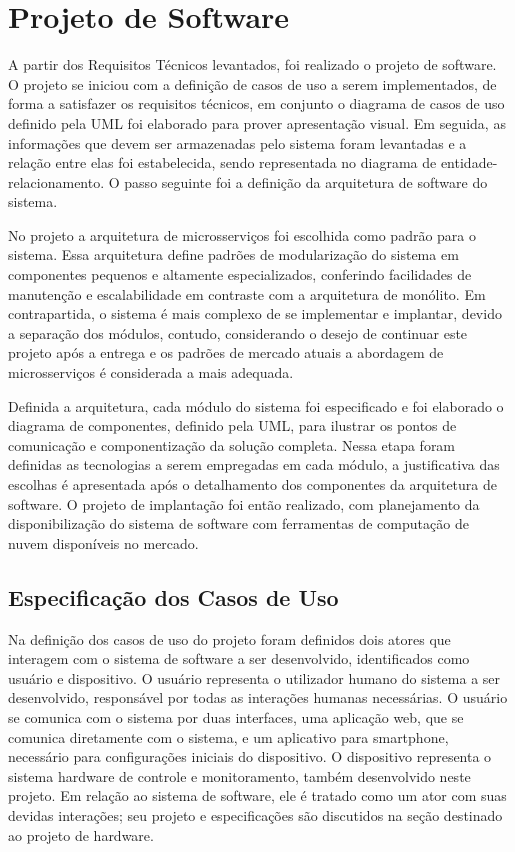\section{Projeto de Software}

A partir dos Requisitos Técnicos levantados, foi realizado o projeto de software. O projeto se iniciou com a definição de casos de uso a serem implementados, de forma a satisfazer os requisitos técnicos, em conjunto o diagrama de casos de uso definido pela UML foi elaborado para prover apresentação visual. Em seguida, as informações que devem ser armazenadas pelo sistema foram levantadas e a relação entre elas foi estabelecida, sendo representada no diagrama de entidade-relacionamento. O passo seguinte foi a definição da arquitetura de software do sistema.

No projeto a arquitetura de microsserviços foi escolhida como padrão para o sistema. Essa arquitetura define padrões de modularização do sistema em componentes pequenos e altamente especializados, conferindo facilidades de manutenção e escalabilidade em contraste com a arquitetura de monólito. Em contrapartida, o sistema é mais complexo de se implementar e implantar, devido a separação dos módulos, contudo, considerando o desejo de continuar este projeto após a entrega e os padrões de mercado atuais a abordagem de microsserviços é considerada a mais adequada. 

Definida a arquitetura, cada módulo do sistema foi especificado e foi elaborado o diagrama de componentes, definido pela UML, para ilustrar os pontos de comunicação e componentização da solução completa. Nessa etapa foram definidas as tecnologias a serem empregadas em cada módulo, a justificativa das escolhas é apresentada após o detalhamento dos componentes da arquitetura de software. O projeto de implantação foi então realizado, com planejamento da disponibilização do sistema de software com ferramentas de computação de nuvem disponíveis no mercado.

\subsection{Especificação dos Casos de Uso}

Na definição dos casos de uso do projeto foram definidos dois atores que interagem com o sistema de software a ser desenvolvido, identificados como 
usuário e dispositivo. O usuário representa o utilizador humano do sistema a ser desenvolvido, responsável por todas as interações humanas necessárias. 
O usuário se comunica com o sistema por duas interfaces, uma aplicação web, que se comunica diretamente com o sistema, e um aplicativo para smartphone, necessário para configurações iniciais do dispositivo. O dispositivo representa o sistema hardware de controle e monitoramento, também desenvolvido neste projeto. Em relação ao sistema de software, ele é tratado como um ator com suas devidas interações; seu projeto e especificações são discutidos na seção destinado ao projeto de hardware.

